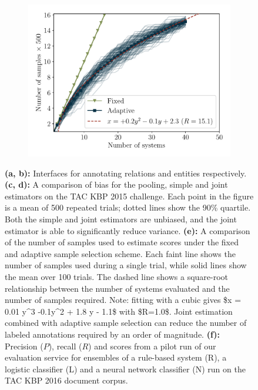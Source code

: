 \begin{figure}
  \begin{subfigure}{0.49\textwidth}
    \centering
    \includegraphics[width=\textwidth]{figures/simulation/simulation-n}
    \caption{}
  \end{subfigure}
  \hfill
  \begin{subfigure}{0.49\textwidth}
    \centering
    
    \vfill
    \caption{\label{fig:evaluation-results}}
  \end{subfigure}

  \caption{\label{fig:simulation}
  \textbf{(a, b):} Interfaces for annotating relations and entities respectively.
  \textbf{(c, d):}
  A comparison of bias for the pooling, simple and joint estimators on the TAC KBP 2015 challenge.
  Each point in the figure is a mean of 500 repeated trials; dotted lines show the 90\% quartile.
  Both the simple and joint estimators are unbiased, and the joint estimator is able to significantly reduce variance.
  \textbf{(e):} 
  A comparison of the number of samples used to estimate scores under the fixed and adaptive sample selection scheme.
  Each faint line shows the number of samples used during a single trial, while solid lines show the mean over 100 trials.
  The dashed line shows a square-root relationship between the number of systems evaluated and the number of samples required.
  \ac{Note: fitting with a cubic gives $x = 0.01 y^3 -0.1y^2 + 1.8 y - 1.1$ with $R=1.0$.}
  Joint estimation combined with adaptive sample selection can reduce the number of labeled annotations required by an order of magnitude.
  \textbf{(f):} 
Precision ($P$), recall ($R$) and \fone{} scores from a pilot run of our evaluation service for ensembles of a rule-based system (R), a logistic classifier (L) and a neural network classifier (N) run on the TAC KBP 2016 document corpus. 
  }
\end{figure}

